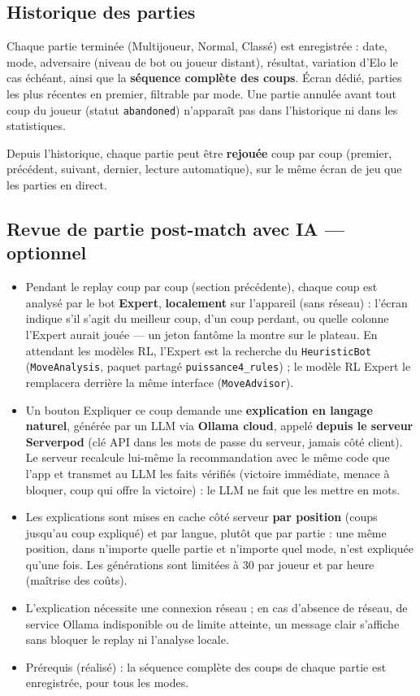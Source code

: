 \documentclass[a4paper,11pt]{article}
\begin{document}
\subsection{Historique des parties}
Chaque partie terminée (Multijoueur, Normal, Classé) est enregistrée : date, mode,
adversaire (niveau de bot ou joueur distant), résultat, variation d'Elo le cas
échéant, ainsi que la \textbf{séquence complète des coups}. Écran dédié, parties les
plus récentes en premier, filtrable par mode. Une partie annulée avant tout coup du
joueur (statut \texttt{abandoned}) n'apparaît pas dans l'historique ni dans les
statistiques.

Depuis l'historique, chaque partie peut être \textbf{rejouée} coup par coup (premier,
précédent, suivant, dernier, lecture automatique), sur le même écran de jeu que les
parties en direct.

\subsection{Revue de partie post-match avec IA --- optionnel}
\label{sec:revue}
\begin{itemize}[leftmargin=1.5em]
  \item Pendant le replay coup par coup (section précédente), chaque coup est
        analysé par le bot \textbf{Expert}, \textbf{localement} sur l'appareil
        (sans réseau) : l'écran indique s'il s'agit du meilleur coup, d'un coup
        perdant, ou quelle colonne l'Expert aurait jouée --- un jeton fantôme
        la montre sur le plateau. En attendant les modèles RL, l'Expert est la
        recherche du \texttt{HeuristicBot} (\texttt{MoveAnalysis}, paquet
        partagé \texttt{puissance4\_rules}) ; le modèle RL Expert le remplacera
        derrière la même interface (\texttt{MoveAdvisor}).
  \item Un bouton \og Expliquer ce coup \fg{} demande une \textbf{explication en
        langage naturel}, générée par un LLM via \textbf{Ollama cloud}, appelé
        \textbf{depuis le serveur Serverpod} (clé API dans les mots de passe du
        serveur, jamais côté client). Le serveur recalcule lui-même la
        recommandation avec le même code que l'app et transmet au LLM les faits
        vérifiés (victoire immédiate, menace à bloquer, coup qui offre la
        victoire) : le LLM ne fait que les mettre en mots.
  \item Les explications sont mises en cache côté serveur \textbf{par position}
        (coups jusqu'au coup expliqué) et par langue, plutôt que par partie : une
        même position, dans n'importe quelle partie et n'importe quel mode, n'est
        expliquée qu'une fois. Les générations sont limitées à 30 par joueur et
        par heure (maîtrise des coûts).
  \item L'explication nécessite une connexion réseau ; en cas d'absence de réseau,
        de service Ollama indisponible ou de limite atteinte, un message clair
        s'affiche sans bloquer le replay ni l'analyse locale.
  \item Prérequis (réalisé) : la séquence complète des coups de chaque partie est
        enregistrée, pour tous les modes.
\end{itemize}
\end{document}
